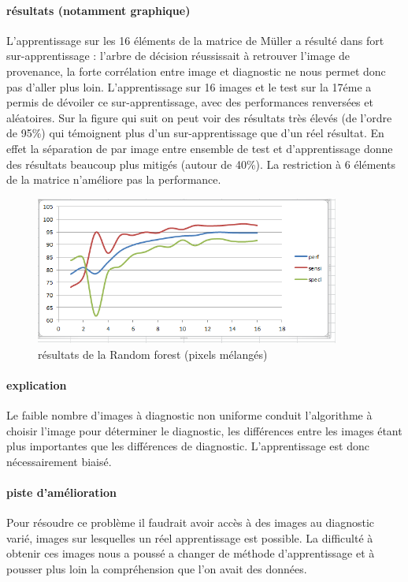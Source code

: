 \documentclass[a4paper,10pt]{report}
\begin{document}
\paragraph{résultats (notamment graphique)}
L'apprentissage sur les 16 éléments de la matrice de Müller a résulté dans fort sur-apprentissage : l'arbre de décision réussissait à retrouver l'image de provenance, la forte corrélation entre image et diagnostic ne nous permet donc pas d'aller plus loin. L'apprentissage sur 16 images et le test sur la 17éme a permis de dévoiler ce sur-apprentissage, avec des performances renversées et aléatoires. Sur la figure qui suit on peut voir des résultats très élevés (de l'ordre de 95\%) qui témoignent plus d'un sur-apprentissage que d'un réel résultat. En effet la séparation de par image entre ensemble de test et d'apprentissage donne des résultats beaucoup plus mitigés (autour de 40\%). La restriction à 6 éléments de la matrice n'améliore pas la performance. 
\begin{figure}[htbp]
  \caption{résultats de la Random forest (pixels mélangés)}
  \centering
  \includegraphics[width=10cm]{RandomForestPerf.png}
\end{figure}
\paragraph{explication}
Le faible nombre d'images à diagnostic non uniforme conduit l'algorithme à choisir l'image pour déterminer le diagnostic, les différences entre les images étant plus importantes que les différences de diagnostic. L'apprentissage est donc nécessairement biaisé. 
\paragraph{piste d'amélioration}
Pour résoudre ce problème il faudrait avoir accès à des images au diagnostic varié, images sur lesquelles un réel apprentissage est possible. La difficulté à obtenir ces images nous a poussé a changer de méthode d'apprentissage et à pousser plus loin la compréhension que l'on avait des données.
\end{document}
